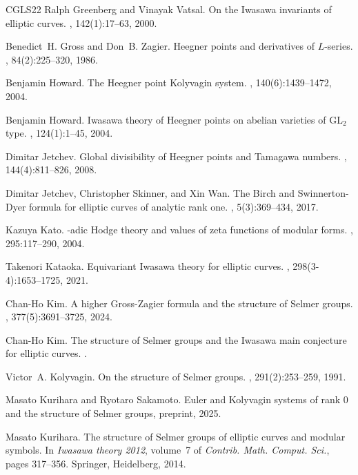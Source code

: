 \documentclass[10pt,reqno]{amsart}
\numberwithin{equation}{section}
\theoremstyle{plain}
\theoremstyle{definition}
\theoremstyle{definition}
\theoremstyle{plain}
\theoremstyle{plain}
\theoremstyle{plain}
\theoremstyle{plain}
\theoremstyle{plain}
\theoremstyle{plain}
\begin{document}
\begin{thebibliography}{CGLS22}
Ralph Greenberg and Vinayak Vatsal.
\newblock On the {I}wasawa invariants of elliptic curves.
, 142(1):17--63, 2000.

Benedict~H. Gross and Don~B. Zagier.
\newblock Heegner points and derivatives of {$L$}-series.
, 84(2):225--320, 1986.

Benjamin Howard.
\newblock The {H}eegner point {K}olyvagin system.
, 140(6):1439--1472, 2004.

Benjamin Howard.
\newblock Iwasawa theory of {H}eegner points on abelian varieties of
  {$\mathrm{GL}_2$} type.
, 124(1):1--45, 2004.

Dimitar Jetchev.
\newblock Global divisibility of {H}eegner points and {T}amagawa numbers.
, 144(4):811--826, 2008.

Dimitar Jetchev, Christopher Skinner, and Xin Wan.
\newblock The {B}irch and {S}winnerton-{D}yer formula for elliptic curves of
  analytic rank one.
, 5(3):369--434, 2017.

Kazuya Kato.
-adic {H}odge theory and values of zeta functions of modular
  forms.
, 295:117--290, 2004.

Takenori Kataoka.
\newblock Equivariant {I}wasawa theory for elliptic curves.
, 298(3-4):1653--1725, 2021.

Chan-Ho Kim.
\newblock A higher {G}ross-{Z}agier formula and the structure of {S}elmer
  groups.
, 377(5):3691--3725, 2024.

Chan-Ho Kim.
\newblock The structure of {S}elmer groups and the {I}wasawa main conjecture
  for elliptic curves.
.

Victor~A. Kolyvagin.
\newblock On the structure of {Selmer} groups.
, 291(2):253--259, 1991.

Masato Kurihara and Ryotaro Sakamoto.
\newblock Euler and {K}olyvagin systems of rank $0$ and the structure of
  {S}elmer groups, preprint, 2025.

Masato Kurihara.
\newblock The structure of {S}elmer groups of elliptic curves and modular
  symbols.
\newblock In {\em Iwasawa theory 2012}, volume~7 of {\em Contrib. Math. Comput.
  Sci.}, pages 317--356. Springer, Heidelberg, 2014.


\end{thebibliography}
\end{document}

